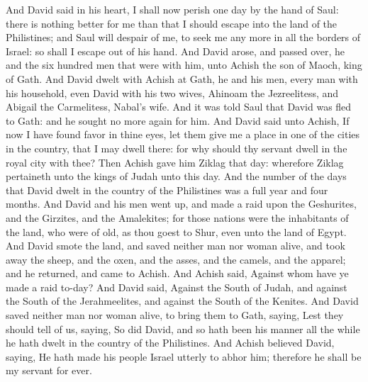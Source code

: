 And David said in his heart, I shall now perish one day by the hand of Saul: there is nothing better for me than that I should escape into the land of the Philistines; and Saul will despair of me, to seek me any more in all the borders of Israel: so shall I escape out of his hand. And David arose, and passed over, he and the six hundred men that were with him, unto Achish the son of Maoch, king of Gath. And David dwelt with Achish at Gath, he and his men, every man with his household, even David with his two wives, Ahinoam the Jezreelitess, and Abigail the Carmelitess, Nabal’s wife. And it was told Saul that David was fled to Gath: and he sought no more again for him.  And David said unto Achish, If now I have found favor in thine eyes, let them give me a place in one of the cities in the country, that I may dwell there: for why should thy servant dwell in the royal city with thee? Then Achish gave him Ziklag that day: wherefore Ziklag pertaineth unto the kings of Judah unto this day. And the number of the days that David dwelt in the country of the Philistines was a full year and four months.  And David and his men went up, and made a raid upon the Geshurites, and the Girzites, and the Amalekites; for those nations were the inhabitants of the land, who were of old, as thou goest to Shur, even unto the land of Egypt. And David smote the land, and saved neither man nor woman alive, and took away the sheep, and the oxen, and the asses, and the camels, and the apparel; and he returned, and came to Achish. And Achish said, Against whom have ye made a raid to-day? And David said, Against the South of Judah, and against the South of the Jerahmeelites, and against the South of the Kenites. And David saved neither man nor woman alive, to bring them to Gath, saying, Lest they should tell of us, saying, So did David, and so hath been his manner all the while he hath dwelt in the country of the Philistines. And Achish believed David, saying, He hath made his people Israel utterly to abhor him; therefore he shall be my servant for ever. 


